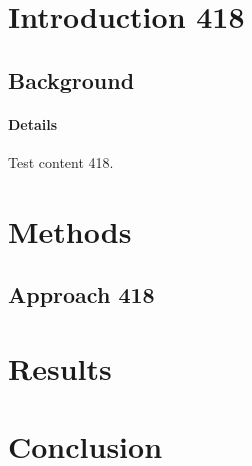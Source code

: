 \documentclass{article}
\begin{document}
\section{Introduction 418}
\subsection{Background}
\paragraph{Details} Test content 418.
\section{Methods}
\subsection{Approach 418}
\section{Results}
\section{Conclusion}
\end{document}
